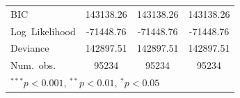 \documentclass[12pt,twoside]{reedthesis}
\begin{document}
\begin{table}
\begin{center}
\begin{scriptsize}
\begin{tabular}{l@{} c@{} c@{} c@{} }
  BIC                                & 143138.26              & 143138.26              & 143138.26              \\
  Log\ Likelihood                    & -71448.76              & -71448.76              & -71448.76              \\
  Deviance                           & 142897.51              & 142897.51              & 142897.51              \\
  Num.\ obs.                         & 95234                  & 95234                  & 95234                  \\
  \bottomrule
  \multicolumn{4}{l}{\tiny{$^{***}p<0.001$, $^{**}p<0.01$, $^*p<0.05$}}
  \end{tabular}
  \end{scriptsize}
  \label{table:coefficients}
  \end{center}
  \end{table}
  
\end{document}
